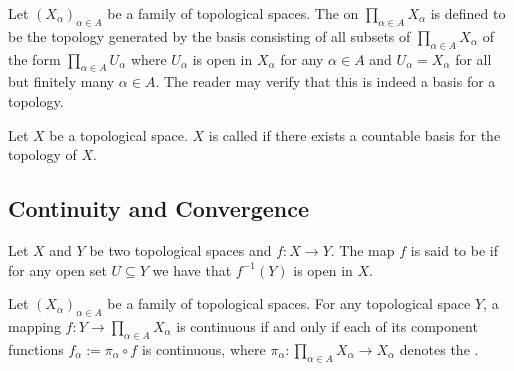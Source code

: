 \begin{example}
	Let $(X_\alpha)_{\alpha \in A}$ be a family of topological spaces. The  on $\prod_{\alpha \in A} X_\alpha$ is defined to be the topology generated by the basis consisting of all subsets of $\prod_{\alpha \in A} X_\alpha$ of the form $\prod_{\alpha \in A} U_\alpha$ where $U_\alpha$ is open in $X_\alpha$ for any $\alpha \in A$ and $U_\alpha = X_\alpha$ for all but finitely many $\alpha \in A$. The reader may verify that this is indeed a basis for a topology.
\end{example}

\begin{definition}
	Let $X$ be a topological space. $X$ is called  if there exists a countable basis for the topology of $X$.
\end{definition}

\subsection{Continuity and Convergence}

\begin{definition}
	Let $X$ and $Y$ be two topological spaces and $f: X \to Y$. The map $f$ is said to be  if for any open set $U \subseteq Y$ we have that $f^{-1}(Y)$ is open in $X$.
\end{definition}

\begin{proposition}
	Let $(X_\alpha)_{\alpha \in A}$ be a family of topological spaces. For any topological space $Y$, a mapping $f: Y \to \prod_{\alpha \in A}X_\alpha$ is continuous if and only if each of its component functions $f_\alpha := \pi_\alpha \circ f$ is continuous, where $\pi_\alpha: \prod_{\alpha \in A}X_\alpha \to X_\alpha$ denotes the .
	\label{prop:characteristic_property_product}
\end{proposition}

